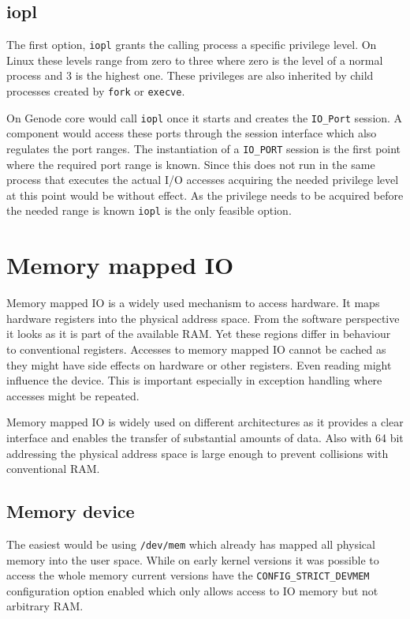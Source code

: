 \documentclass[
a4paper,
12pt,
notitlepage,
parskip=half,
DIV=11,
]{scrbook}
\begin{document}
		\subsection{iopl}
		
		The first option, \texttt{iopl} grants the calling process a specific privilege level.
		On Linux these levels range from zero to three where zero is the level of a normal process and 3 is the highest one.
		These privileges are also inherited by child processes created by \texttt{fork} or \texttt{execve}. \citep{iopl}
		
		On Genode core would call \texttt{iopl} once it starts and creates the \texttt{IO\_Port} session.
		A component would access these ports through the session interface which also regulates the port ranges.
		The instantiation of a \texttt{IO\_PORT} session is the first point where the required port range is known.
		Since this does not run in the same process that executes the actual I/O accesses acquiring the needed privilege level at this point would be without effect.
		As the privilege needs to be acquired before the needed range is known \texttt{iopl} is the only feasible option.
		
		\section{Memory mapped IO}
		
		Memory mapped IO is a widely used mechanism to access hardware.
		It maps hardware registers into the physical address space.
		From the software perspective it looks as it is part of the available RAM.
		Yet these regions differ in behaviour to conventional registers.
		Accesses to memory mapped IO cannot be cached as they might have side effects on hardware or other registers.
		Even reading might influence the device.
		This is important especially in exception handling where accesses might be repeated.
		
		Memory mapped IO is widely used on different architectures as it provides a clear interface and enables the transfer of substantial amounts of data.
		Also with 64 bit addressing the physical address space is large enough to prevent collisions with conventional RAM.
		\citep{intelmanual}
		
		
		\subsection{Memory device}
		
		The easiest would be using \texttt{/dev/mem} which already has mapped all physical memory into the user space.
		While on early kernel versions it was possible to access the whole memory current versions have the \texttt{CONFIG\_STRICT\_DEVMEM} configuration option enabled which only allows access to IO memory but not arbitrary RAM.
		
\end{document}
